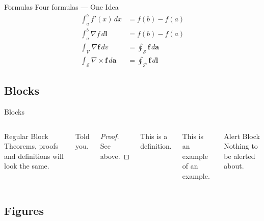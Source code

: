 \documentclass[fleqn,compress,utf8,aspectratio=169,t]{beamer}
\begin{document}
\begin{frame}{Formulas}
  Four formulas --- One Idea
  \begin{align}
    \int^{b}_{a} f'(x) \, dx                                 & = f(b) - f(a) \\
    \int^b_{a} \nabla f\,d\mathbf{l}                         & = f(b) - f(a) \\
    \int_{\mathcal{V}} \nabla\mathbf{f} \, dv                & =
    \oint_{\mathcal{S}} \mathbf{f} \, d\mathbf{a}                            \\
    \int_{\mathcal{S}} \nabla\times\mathbf{f} \, d\mathbf{a} & =
    \oint_{\mathcal{P}} \mathbf{f} \, d\mathbf{l}
  \end{align}
\end{frame}

\subsection{Blocks}

\begin{frame}{Blocks}
  \begin{columns}[t]
    \begin{block}{Regular Block}
      Theorems, proofs and definitions will look the same.
    \end{block}
    \begin{theorem}
      Told you.
    \end{theorem}
    \begin{proof}
      See above.
    \end{proof}
    \begin{definition}
      This is a definition.
    \end{definition}
    \begin{example}
      This is an example of an example.
    \end{example}
    \begin{alertblock}{Alert Block}
      Nothing to be \alert{alerted} about.
    \end{alertblock}
  \end{columns}
\end{frame}

\subsection{Figures}
\end{document}
